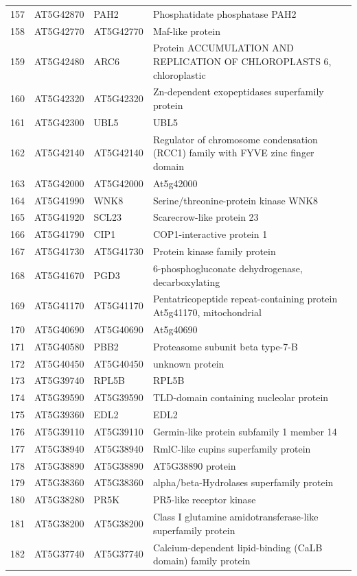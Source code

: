 \documentclass[11pt]{article}
\begin{document}
\begin{center}
\begin{tabular}{rlll}
157 & AT5G42870 & PAH2 & Phosphatidate phosphatase PAH2\\
158 & AT5G42770 & AT5G42770 & Maf-like protein\\
159 & AT5G42480 & ARC6 & Protein ACCUMULATION AND REPLICATION OF CHLOROPLASTS 6, chloroplastic\\
160 & AT5G42320 & AT5G42320 & Zn-dependent exopeptidases superfamily protein\\
161 & AT5G42300 & UBL5 & UBL5\\
162 & AT5G42140 & AT5G42140 & Regulator of chromosome condensation (RCC1) family with FYVE zinc finger domain\\
163 & AT5G42000 & AT5G42000 & At5g42000\\
164 & AT5G41990 & WNK8 & Serine/threonine-protein kinase WNK8\\
165 & AT5G41920 & SCL23 & Scarecrow-like protein 23\\
166 & AT5G41790 & CIP1 & COP1-interactive protein 1\\
167 & AT5G41730 & AT5G41730 & Protein kinase family protein\\
168 & AT5G41670 & PGD3 & 6-phosphogluconate dehydrogenase, decarboxylating\\
169 & AT5G41170 & AT5G41170 & Pentatricopeptide repeat-containing protein At5g41170, mitochondrial\\
170 & AT5G40690 & AT5G40690 & At5g40690\\
171 & AT5G40580 & PBB2 & Proteasome subunit beta type-7-B\\
172 & AT5G40450 & AT5G40450 & unknown protein\\
173 & AT5G39740 & RPL5B & RPL5B\\
174 & AT5G39590 & AT5G39590 & TLD-domain containing nucleolar protein\\
175 & AT5G39360 & EDL2 & EDL2\\
176 & AT5G39110 & AT5G39110 & Germin-like protein subfamily 1 member 14\\
177 & AT5G38940 & AT5G38940 & RmlC-like cupins superfamily protein\\
178 & AT5G38890 & AT5G38890 & AT5G38890 protein\\
179 & AT5G38360 & AT5G38360 & alpha/beta-Hydrolases superfamily protein\\
180 & AT5G38280 & PR5K & PR5-like receptor kinase\\
181 & AT5G38200 & AT5G38200 & Class I glutamine amidotransferase-like superfamily protein\\
182 & AT5G37740 & AT5G37740 & Calcium-dependent lipid-binding (CaLB domain) family protein\\

\end{tabular}
\end{center}
\end{document}
